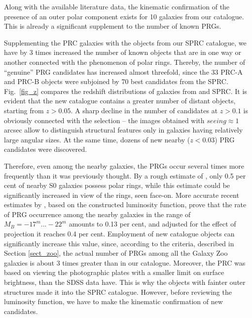 \documentclass[useAMS,usenatbib]{mn2e}
\begin{document}
Along with the available literature data, the kinematic
confirmation of the presence of an outer polar component exists
for 10 galaxies from our catalogue. This is already a significant
supplement to the number of known PRGs.



Supplementing the PRC galaxies with the objects from our SPRC
catalogue, we have by 3 times increased the number of known
objects that are in one way or another connected with the
phenomenon of polar rings. Thereby, the number of ``genuine'' PRG
candidates has increased almost threefold, since the 33 PRC-A and
PRC-B objects were subjoined by   70 best candidates  from the SPRC.
Fig.~\ref{fig_z} compares the redshift distributions of galaxies
from \citet{Whitmore1990} and SPRC. It is evident that the new
catalogue contains a greater number of distant objects, starting
from $z>0.05$. A sharp decline in the number of candidates at
$z>0.1$ is obviously connected with the selection -- the images
obtained with $seeing\approx1$ arcsec allow to distinguish
structural features only in   galaxies having relatively large angular sizes. At the same
time, dozens of new nearby ($z<0.03$) PRG candidates were
discovered.



Therefore, even among the nearby galaxies, the PRGs occur several times
more frequently than it was previously thought. By a rough
estimate of \citet{Whitmore1990}, only 0.5 per cent of nearby S0 galaxies
possess polar rings, while this estimate could be significantly increased
in view of the rings, seen face-on. More accurate recent
estimates by \citet{Resh2011}, based on the constructed luminosity
function, prove that the rate of PRG occurrence among the nearby
galaxies   in the range of $M_B=-17^m...-22^m$ amounts to 0.13 per cent,
and adjusted for the effect of projection it reaches  0.4 per cent.
Employment of new catalogue objects can significantly increase
this value, since, according to the criteria, described in
Section \ref{sect_zoo}, the actual number of PRGs among all the
Galaxy Zoo galaxies is about 3 times greater than in our
catalogue. Moreover, the PRC was based on viewing the photographic
plates with a smaller limit on surface brightness, than the SDSS
data have. This is why the objects with fainter outer structures
made it into the SPRC catalogue. However, before reviewing the
luminosity function, we have to make the kinematic confirmation of
new candidates.
\end{document}
